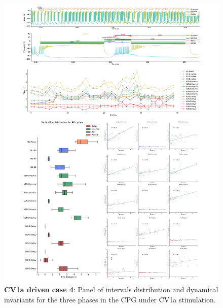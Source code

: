 \begin{figure}[htbp]
	\centering
	\includegraphics[width=1.1\textwidth]{./invariants/data/SUSSEX/CV1a_driven4/images/3phases/panel_with_intervals.pdf}
	\caption{\textbf{CV1a driven case 4}: Panel of intervals distribution and dynamical invariants for the three phases in the CPG under CV1a stimulation.}
	\label{fig:cv1a 4 3phases}
\end{figure}

